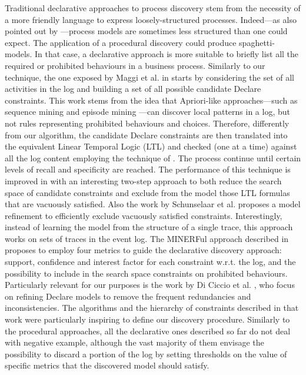 Traditional declarative approaches to process discovery stem from the necessity of a more friendly language to express loosely-structured processes. Indeed---as also pointed out by \cite{2012-Maggi}---process models are sometimes less structured than one could expect. The application of a procedural discovery could produce spaghetti-models. In that case, a declarative approach is more suitable to briefly list all the required or prohibited behaviours in a business process.
Similarly to our technique, the one exposed by Maggi et al. in \cite{2011-Maggi} starts by considering the set of all activities in the log and building a set of all possible candidate Declare constraints. This work stems from the idea that Apriori-like approaches---such as sequence mining \cite{1994-Agrawal} and episode mining \cite{1997-Mannila}---can discover local patterns in a log, but not rules representing prohibited behaviours and choices. Therefore, differently from our algorithm, the candidate Declare constraints are then translated into the equivalent Linear Temporal Logic (LTL) and checked (one at a time) against all the log content employing the technique of \cite{2005-Aalst}. The process continue until certain levels of recall and specificity are reached. The performance of this technique is improved in \cite{2012-Maggi} with an interesting two-step approach to both reduce the search space of candidate constraints and exclude from the model those LTL formulas that are vacuously satisfied.
Also the work \cite{2012-Schunselaar} by Schunselaar et al. proposes a model refinement to efficiently exclude vacuously satisfied constraints. Interestingly, instead of learning the model from the structure of a single trace, this approach works on sets of traces in the event log.
The MINERFul approach described in \cite{2015-DiCiccio} proposes to employ four metrics to guide the declarative discovery approach: support, confidence and interest factor for each constraint w.r.t. the log, and the possibility to include in the search space constraints on prohibited behaviours.
Particularly relevant for our purposes is the work by Di Ciccio et al. \cite{2017-DiCiccio}, who focus on refining Declare models to remove the frequent redundancies and inconsistencies. The algorithms and the hierarchy of constraints described in that work were particularly inspiring to define our discovery procedure.
Similarly to the procedural approaches, all the declarative ones described so far do not deal with negative example, although the vast majority of them envisage the possibility to discard a portion of the log by setting thresholds on the value of specific metrics that the discovered model should satisfy.
 
